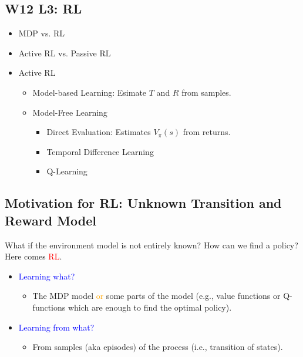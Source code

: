 \subsection{W12 L3: RL}
\begin{summary}
    \begin{itemize}
        \item MDP vs. RL
        \item Active RL vs. Passive RL
        \item Active RL
        \begin{itemize}
            \item Model-based Learning: Esimate $T$ and $R$ from samples.
            \item Model-Free Learning
            \begin{itemize}
                \item Direct Evaluation: Estimates $V_\pi (s)$ from returns.
                \item Temporal Difference Learning
                \item Q-Learning
            \end{itemize}
        \end{itemize}
    \end{itemize}
\end{summary}

\subsection{Motivation for RL: Unknown Transition and Reward Model}
\begin{intuition}
    What if the environment model is not entirely known? How can we find a policy? Here comes \textcolor{red}{RL}.
        \begin{itemize}
            \item \textcolor{blue}{Learning what?}
            \begin{itemize}
                \item The MDP model \textcolor{orange}{or} some parts of the model 
                (e.g., value functions or Q-functions which are enough to find the optimal policy).
            \end{itemize}
            \item \textcolor{blue}{Learning from what?}
            \begin{itemize}
                \item From samples (aka episodes) of the process (i.e., transition of states).
            \end{itemize}
        \end{itemize}
\end{intuition}

